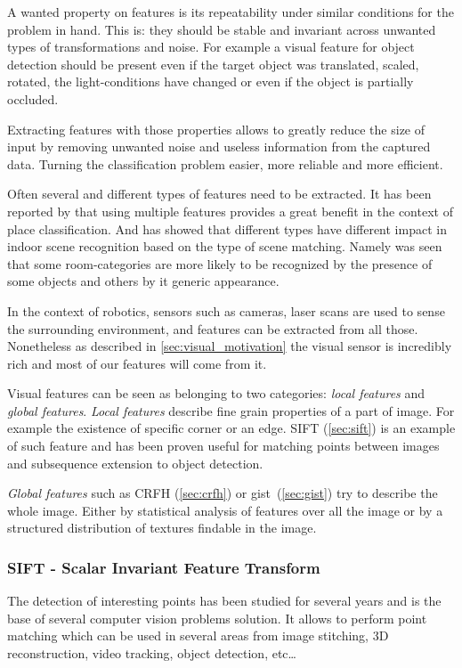 A wanted property on features is its repeatability under similar conditions for the problem in hand. This is: they should be stable and invariant across unwanted types of transformations and noise.
For example a visual feature for object detection should be present even if the target object was translated, scaled, rotated, the light-conditions have changed or even if the object is partially occluded.

Extracting features with those properties allows to greatly reduce the size of input by removing unwanted noise and useless information from the captured data.
Turning the classification problem easier, more reliable and more efficient.

Often several and different types of features need to be extracted. It has been reported by \cite{pronobis2010ijrr} that using multiple features provides a great benefit in the context of place classification.
And \cite{quattoni2009recognizing} has showed that different types have different impact in indoor scene recognition based on the type of scene matching.
Namely was seen that some room-categories are more likely to be recognized by the presence of some objects and others by it generic appearance.

In the context of robotics, sensors such as cameras, laser scans are used to sense the surrounding environment, and features can be extracted from all those. Nonetheless as described in \autoref{sec:visual_motivation} the visual sensor is incredibly rich and most of our features will come from it.

Visual features can be seen as belonging to two categories: \emph{local features} and \emph{global features}.
\emph{Local features} describe fine grain properties of a part of image. For example the existence of specific corner or an edge. \Gls{SIFT} (\autoref{sec:sift}) is an example of such feature and has been proven useful for matching points between images and subsequence extension to object detection.

\emph{Global features} such as \gls{CRFH} (\autoref{sec:crfh}) or {gist}~(\autoref{sec:gist}) try to describe the whole image. Either by statistical analysis of features over all the image or by a structured distribution of textures findable in the image.

\subsubsection{{SIFT} - Scalar Invariant Feature Transform}
\label{sec:sift}\label{sec:local-features}
The detection of interesting points has been studied for several years and is the base of several computer vision problems solution. It allows to perform point matching which can be used in several areas from image stitching, 3D reconstruction, video tracking, object detection, etc\dots

